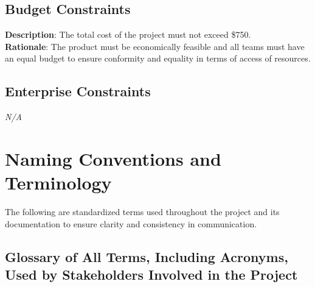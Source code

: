 \documentclass[12pt]{article}
\begin{document}
\subsection{Budget Constraints}
\textbf{Description}: The total cost of the project must not exceed \$750.\\
\textbf{Rationale}: The product must be economically feasible and all teams must
have an equal budget to ensure conformity and equality in terms of access of
resources.

\subsection{Enterprise Constraints}
\emph{N/A}

\section{Naming Conventions and Terminology}
The following are standardized terms used throughout the project and its
documentation to ensure clarity and consistency in communication.

\subsection{Glossary of All Terms, Including Acronyms, Used by Stakeholders Involved in the Project}
\end{document}
